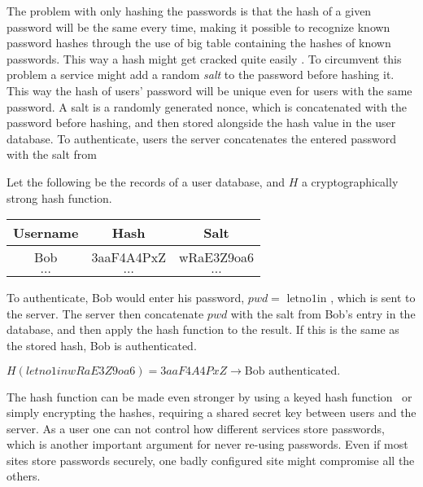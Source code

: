 \par The problem with only hashing the passwords is that the hash of a given password will be the same every time, making it possible to recognize known password hashes through the use of big table containing the hashes of known passwords. This way a hash might get cracked quite easily . To circumvent this problem a service might add a random \emph{salt} to the password before hashing it. This way the hash of users' password will be unique even for users with the same password. A salt is a randomly generated nonce, which is concatenated with the password before hashing, and then stored alongside the hash value in the user database. To authenticate, users the server concatenates the entered password with the salt from 

\begin{example}
Let the following be the records of a user database, and $H$ a cryptographically strong hash function.
    \begin{table}[ht!]
        \centering
    \begin{tabular}{|c|c|c|}
        \hline
        Username & Hash & Salt \\
        \hline
        Bob & 3aaF4A4PxZ & wRaE3Z9oa6 \\
        \hline
        $\dots$ & $\dots$ & $\dots$ \\
        \hline
    \end{tabular}
    \end{table}
\par To authenticate, Bob would enter his password, $pwd=\text{ letno1in }$, which is sent to the server. The server then concatenate $pwd$ with the salt from Bob's entry in the database, and then apply the hash function to the result. If this is the same as the stored hash, Bob is authenticated.\\
 \centerline{   $H(letno1inwRaE3Z9oa6) = 3aaF4A4PxZ \rightarrow \text{Bob authenticated}.$  }

\end{example}



The hash function can be made even stronger by using a keyed hash function~\cite{keyedhash} or simply encrypting the hashes, requiring a shared secret key between users and the server. As a user one can not control how different services store passwords, which is another important argument for never re-using passwords. Even if most sites store passwords securely, one badly configured site might compromise all the others. 



